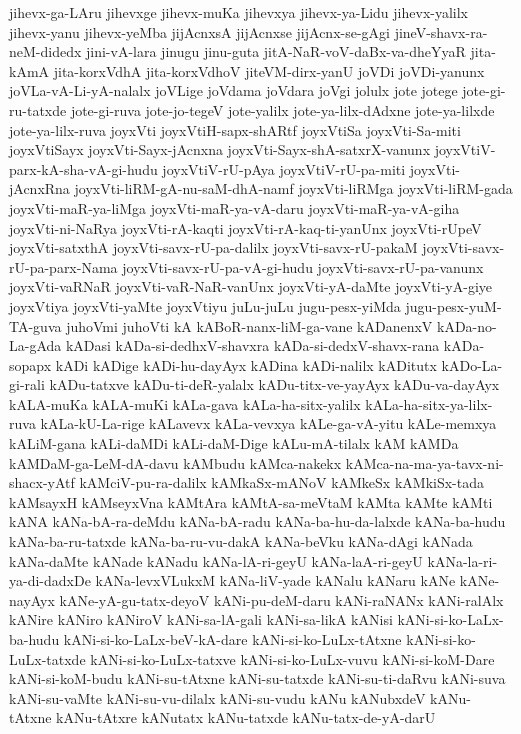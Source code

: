 {jihevx-ga-LAru
jihevxge
jihevx-muKa
jihevxya
jihevx-ya-Lidu
jihevx-yalilx
jihevx-yanu
jihevx-yeMba
jijAcnxsA
jijAcnxse
jijAcnx-se-gAgi
jineV-shavx-ra-neM-didedx
jini-vA-lara
jinugu
jinu-guta
jitA-NaR-voV-daBx-va-dheYyaR
jita-kAmA
jita-korxVdhA
jita-korxVdhoV
jiteVM-dirx-yanU
joVDi
joVDi-yanunx
joVLa-vA-Li-yA-nalalx
joVLige
joVdama
joVdara
joVgi
jolulx
jote
jotege
jote-gi-ru-tatxde
jote-gi-ruva
jote-jo-tegeV
jote-yalilx
jote-ya-lilx-dAdxne
jote-ya-lilxde
jote-ya-lilx-ruva
joyxVti
joyxVtiH-sapx-shARtf
joyxVtiSa
joyxVti-Sa-miti
joyxVtiSayx
joyxVti-Sayx-jAcnxna
joyxVti-Sayx-shA-satxrX-vanunx
joyxVtiV-parx-kA-sha-vA-gi-hudu
joyxVtiV-rU-pAya
joyxVtiV-rU-pa-miti
joyxVti-jAcnxRna
joyxVti-liRM-gA-nu-saM-dhA-namf
joyxVti-liRMga
joyxVti-liRM-gada
joyxVti-maR-ya-liMga
joyxVti-maR-ya-vA-daru
joyxVti-maR-ya-vA-giha
joyxVti-ni-NaRya
joyxVti-rA-kaqti
joyxVti-rA-kaq-ti-yanUnx
joyxVti-rUpeV
joyxVti-satxthA
joyxVti-savx-rU-pa-dalilx
joyxVti-savx-rU-pakaM
joyxVti-savx-rU-pa-parx-Nama
joyxVti-savx-rU-pa-vA-gi-hudu
joyxVti-savx-rU-pa-vanunx
joyxVti-vaRNaR
joyxVti-vaR-NaR-vanUnx
joyxVti-yA-daMte
joyxVti-yA-giye
joyxVtiya
joyxVti-yaMte
joyxVtiyu
juLu-juLu
jugu-pesx-yiMda
jugu-pesx-yuM-TA-guva
juhoVmi
juhoVti
kA
kABoR-nanx-liM-ga-vane
kADanenxV
kADa-no-La-gAda
kADasi
kADa-si-dedhxV-shavxra
kADa-si-dedxV-shavx-rana
kADa-sopapx
kADi
kADige
kADi-hu-dayAyx
kADina
kADi-nalilx
kADitutx
kADo-La-gi-rali
kADu-tatxve
kADu-ti-deR-yalalx
kADu-titx-ve-yayAyx
kADu-va-dayAyx
kALA-muKa
kALA-muKi
kALa-gava
kALa-ha-sitx-yalilx
kALa-ha-sitx-ya-lilx-ruva
kALa-kU-La-rige
kALavevx
kALa-vevxya
kALe-ga-vA-yitu
kALe-memxya
kALiM-gana
kALi-daMDi
kALi-daM-Dige
kALu-mA-tilalx
kAM
kAMDa
kAMDaM-ga-LeM-dA-davu
kAMbudu
kAMca-nakekx
kAMca-na-ma-ya-tavx-ni-shacx-yAtf
kAMciV-pu-ra-dalilx
kAMkaSx-mANoV
kAMkeSx
kAMkiSx-tada
kAMsayxH
kAMseyxVna
kAMtAra
kAMtA-sa-meVtaM
kAMta
kAMte
kAMti
kANA
kANa-bA-ra-deMdu
kANa-bA-radu
kANa-ba-hu-da-lalxde
kANa-ba-hudu
kANa-ba-ru-tatxde
kANa-ba-ru-vu-dakA
kANa-beVku
kANa-dAgi
kANada
kANa-daMte
kANade
kANadu
kANa-lA-ri-geyU
kANa-laA-ri-geyU
kANa-la-ri-ya-di-dadxDe
kANa-levxVLukxM
kANa-liV-yade
kANalu
kANaru
kANe
kANe-nayAyx
kANe-yA-gu-tatx-deyoV
kANi-pu-deM-daru
kANi-raNANx
kANi-ralAlx
kANire
kANiro
kANiroV
kANi-sa-lA-gali
kANi-sa-likA
kANisi
kANi-si-ko-LaLx-ba-hudu
kANi-si-ko-LaLx-beV-kA-dare
kANi-si-ko-LuLx-tAtxne
kANi-si-ko-LuLx-tatxde
kANi-si-ko-LuLx-tatxve
kANi-si-ko-LuLx-vuvu
kANi-si-koM-Dare
kANi-si-koM-budu
kANi-su-tAtxne
kANi-su-tatxde
kANi-su-ti-daRvu
kANi-suva
kANi-su-vaMte
kANi-su-vu-dilalx
kANi-su-vudu
kANu
kANubxdeV
kANu-tAtxne
kANu-tAtxre
kANutatx
kANu-tatxde
kANu-tatx-de-yA-darU
}
